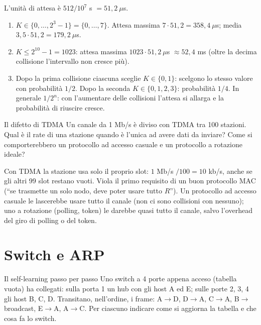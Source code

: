 \svolgimento
L'unità di attesa è $512 / 10^7$ s $= 51{,}2\ \mu$s.
\begin{enumerate}[label=(\alph*)]
    \item $K \in \{0, \dots, 2^3 - 1\} = \{0, \dots, 7\}$. Attesa massima $7 \cdot 51{,}2 = 358{,}4\ \mu$s; media $3{,}5 \cdot 51{,}2 = 179{,}2\ \mu$s.
    \item $K \le 2^{10} - 1 = 1023$: attesa massima $1023 \cdot 51{,}2\ \mu$s $\approx 52{,}4$ ms (oltre la decima collisione l'intervallo non cresce più).
    \item Dopo la prima collisione ciascuna sceglie $K \in \{0, 1\}$: scelgono lo stesso valore con probabilità $1/2$. Dopo la seconda
          $K \in \{0,1,2,3\}$: probabilità $1/4$. In generale $1/2^n$: con l'aumentare delle collisioni l'attesa si allarga e la
          probabilità di riuscire cresce.
\end{enumerate}

\begin{esercizio}{Il difetto di TDMA}
Un canale da 1 Mb/s è diviso con TDMA tra 100 stazioni. Qual è il rate di una stazione quando è l'unica ad avere dati da inviare?
Come si comporterebbero un protocollo ad accesso casuale e un protocollo a rotazione ideale?
\end{esercizio}

\svolgimento
Con TDMA la stazione usa solo il proprio slot: $1$ Mb/s $/ 100 = 10$ kb/s, anche se gli altri 99 slot restano vuoti. Viola il primo
requisito di un buon protocollo MAC (``se trasmette un solo nodo, deve poter usare tutto $R$''). Un protocollo ad accesso casuale le
lascerebbe usare tutto il canale (non ci sono collisioni con nessuno); uno a rotazione (polling, token) le darebbe quasi tutto il canale,
salvo l'overhead del giro di polling o del token.

\section{Switch e ARP}

\begin{esercizio}{Il self-learning passo per passo}
Uno switch a 4 porte appena acceso (tabella vuota) ha collegati: sulla porta 1 un hub con gli host A ed E; sulle porte 2, 3, 4 gli host
B, C, D. Transitano, nell'ordine, i frame: A$\rightarrow$D, D$\rightarrow$A, C$\rightarrow$A, B$\rightarrow$broadcast,
E$\rightarrow$A, A$\rightarrow$C. Per ciascuno indicare come si aggiorna la tabella e che cosa fa lo switch.
\end{esercizio}

